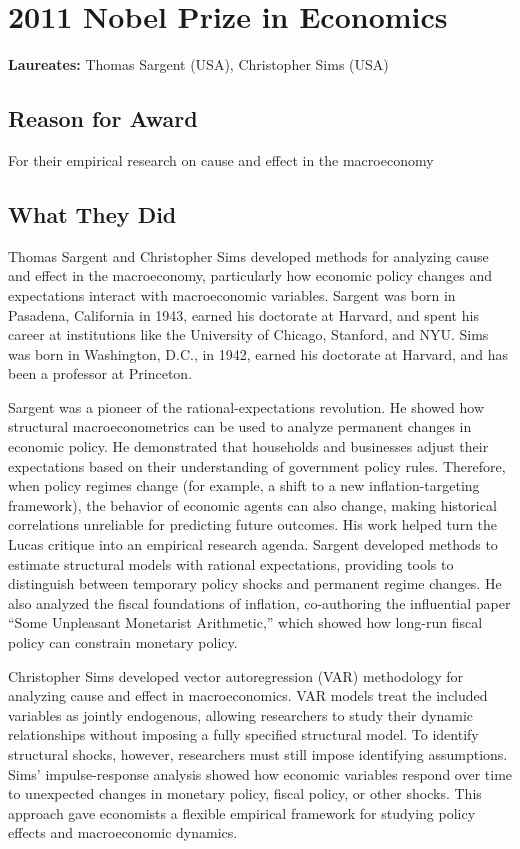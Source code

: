 \chapter{2011 Nobel Prize in Economics}
\textbf{Laureates: }Thomas Sargent (USA), Christopher Sims (USA)

\section*{Reason for Award}
For their empirical research on cause and effect in the macroeconomy

\section{What They Did}
Thomas Sargent and Christopher Sims developed methods for analyzing cause and
effect in the macroeconomy, particularly how economic policy changes and expectations
interact with macroeconomic variables. Sargent was born in Pasadena, California in
1943, earned his doctorate at Harvard, and spent his career at institutions like
the University of Chicago, Stanford, and NYU. Sims was born in Washington, D.C., in
1942, earned his doctorate at Harvard, and has been a professor at Princeton.

Sargent was a pioneer of the rational-expectations revolution. He showed how
structural macroeconometrics can be used to analyze permanent changes in economic
policy. He demonstrated that households and businesses adjust their expectations
based on their understanding of government policy rules. Therefore, when policy
regimes change (for example, a shift to a new inflation-targeting framework), the
behavior of economic agents can also change, making historical correlations
unreliable for predicting future outcomes. His work helped turn the Lucas critique
into an empirical research agenda. Sargent developed methods to estimate
structural models with rational expectations, providing tools to distinguish
between temporary policy shocks and permanent regime changes. He also analyzed
the fiscal foundations of inflation, co-authoring the influential paper ``Some
Unpleasant Monetarist Arithmetic,'' which showed how long-run fiscal policy can
constrain monetary policy.

Christopher Sims developed vector autoregression (VAR) methodology for analyzing
cause and effect in macroeconomics. VAR models treat the included variables as
jointly endogenous, allowing researchers to study their dynamic relationships
without imposing a fully specified structural model. To identify structural
shocks, however, researchers must still impose identifying assumptions. Sims'
impulse-response analysis showed how economic variables respond over time to
unexpected changes in monetary policy, fiscal policy, or other shocks. This
approach gave economists a flexible empirical framework for studying policy
effects and macroeconomic dynamics.

